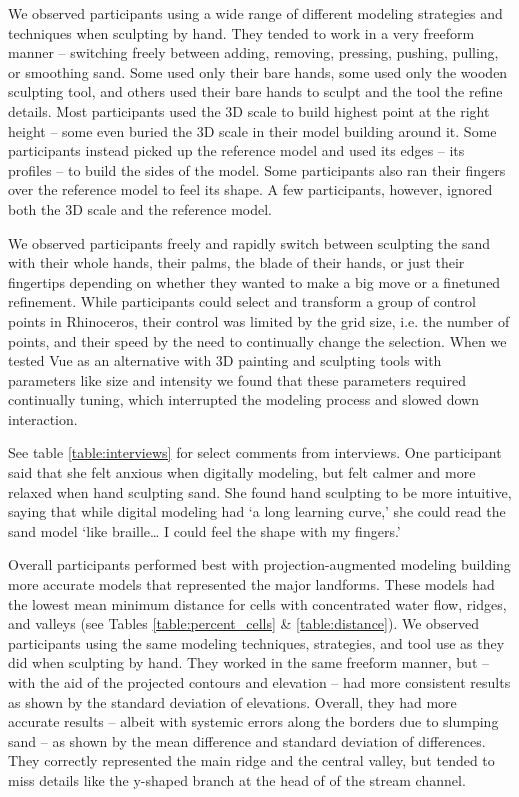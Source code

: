 \documentclass[prodmode,acmtochi]{acmsmall} %
\begin{document}
We observed participants using 
a wide range of different modeling strategies
and techniques when sculpting by hand. 
They tended to work in a very freeform manner 
-- switching freely between
adding, removing, pressing, pushing, pulling, or smoothing
sand. 
Some used only their bare hands, 
some used only the wooden sculpting tool,
and others used their bare hands to sculpt 
and the tool the refine details. 
Most participants used the 3D scale
to build highest point at the right height
-- some even buried the 3D scale in their model
building around it. 
%
Some participants instead 
picked up the reference model
and used its edges -- its profiles -- to build 
the sides of the model. 
Some participants also ran their fingers 
over the reference model to feel its shape.
A few  participants, however,
ignored both the 3D scale
and the reference model. 

We observed participants 
freely and rapidly switch between 
sculpting the sand with 
their whole hands,
their palms,
the blade of their hands, 
or just their fingertips 
depending on whether 
they wanted to make a big move
or a finetuned refinement.
%
While participants could select and transform
a group of control points in Rhinoceros,
their control was limited by the grid size, i.e. the number of points,
and their speed by the need to continually change the selection.
%
When we tested Vue as an alternative
with 3D painting and sculpting tools
with parameters like size and intensity
we found that these parameters 
required continually tuning,
which interrupted the modeling process 
and slowed down interaction.

See table \ref{table:interviews} for select comments from interviews.
One participant said that she felt anxious when digitally modeling,
but felt calmer and more relaxed when hand sculpting sand. 
She found hand sculpting to be more intuitive, saying that
while digital modeling had `a long learning curve,' 
she could read the sand model `like braille\ldots 
I could feel the shape with my fingers.'

Overall participants performed best
with projection-augmented modeling
building more accurate models 
that represented the major landforms.
%
These models had the lowest mean minimum distance 
for cells with concentrated water flow, ridges, and valleys
(see Tables \ref{table:percent_cells} \& \ref{table:distance}). 
%
We observed participants using the same
modeling techniques, strategies, and tool use
as they did when sculpting by hand. 
They worked in the same freeform manner, but 
-- with the aid of the projected contours and elevation --
had more consistent results 
as shown by the standard deviation of elevations.
%
Overall, they had more accurate results
-- albeit with systemic errors along the borders 
due to slumping sand --
as shown by the mean difference and
standard deviation of differences. 
%
They correctly represented the main ridge and 
the central valley, but tended to miss details
like the y-shaped branch at the head of
of the stream channel. 
\end{document}
